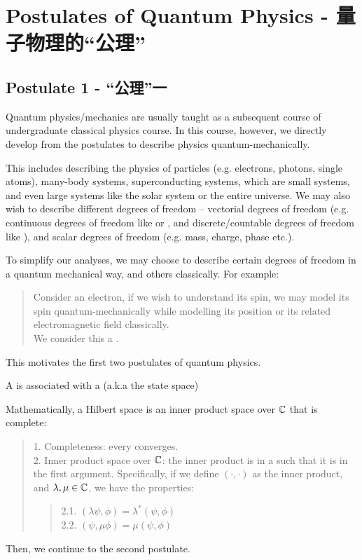 \section{Postulates of Quantum Physics - 量子物理的“公理”}
\subsection{Postulate 1 - “公理”一}
Quantum physics/mechanics are usually taught as a subsequent course of undergraduate classical physics course. In this course, however, we directly develop from the postulates to describe physics quantum-mechanically. \par
This includes describing the physics of particles (e.g. electrons, photons, single atoms), many-body systems, superconducting systems, which are small systems, and even large systems like the solar system or the entire universe. We may also wish to describe different degrees of freedom -- vectorial degrees of freedom (e.g. continuous degrees of freedom like  or , and discrete/countable degrees of freedom like ), and scalar degrees of freedom (e.g. mass, charge, phase etc.). \par
To simplify our analyses, we may choose to describe certain degrees of freedom in a quantum mechanical way, and others classically. For example:
\begin{quote}
    Consider an electron, if we wish to understand its spin, we may model its spin quantum-mechanically while modelling its position or its related electromagnetic field classically. \\
    We consider this a .
\end{quote} \par
This motivates the first two postulates of quantum physics.
\begin{postulate}
    A  is associated with a  (a.k.a the state space)
\end{postulate}
Mathematically, a Hilbert space is an inner product space over $\mathbb{C}$ that is complete:
\begin{quote}
    1. Completeness: every  converges. \\
    2. Inner product space over $\mathbb{C}$: the inner product is in a  such that it is  in the first argument. Specifically, if we define $(\cdot, \cdot)$ as the inner product, and $\lambda, \mu \in \mathbb{C}$, we have the properties:
    \begin{quote}
        2.1. $(\lambda \psi, \phi) = \lambda^{*} (\psi, \phi)$ \\
        2.2. $(\psi, \mu \phi) = \mu (\psi, \phi)$
    \end{quote}
\end{quote}
Then, we continue to the second postulate.
